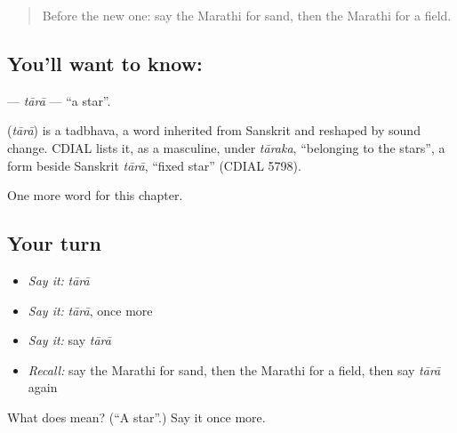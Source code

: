 \begin{quote}
Before the new one: say the Marathi for sand, then the Marathi for a field.
\end{quote}

\subsection*{You'll want to know: }
\textbf{} — \emph{tārā} — \textquotedblleft{}a star\textquotedblright{}.

\begin{cousinweb}
\textbf{} (\emph{tārā}) is a tadbhava, a word inherited from Sanskrit and reshaped by sound change. CDIAL lists it, as a masculine, under \emph{tāraka}, \textquotedblleft{}belonging to the stars\textquotedblright{}, a form beside Sanskrit \emph{tārā}, \textquotedblleft{}fixed star\textquotedblright{} (CDIAL 5798).
\end{cousinweb}

\begin{grammarlens}[title={What you've built}]
One more word for this chapter.
\end{grammarlens}

\subsection*{Your turn}
\begin{itemize}
\raggedright
  \item \emph{Say it:} \emph{tārā}
  \item \emph{Say it:} \emph{tārā}, once more
  \item \emph{Say it:} say \emph{tārā}
  \item \emph{Recall:} say the Marathi for sand, then the Marathi for a field, then say \emph{tārā} again
\end{itemize}

\begin{tcolorbox}[breakable,colback=teal!4,colframe=teal!35!black,title={Before you move on}]
What does  mean? (\textquotedblleft{}A star\textquotedblright{}.) Say it once more.
\end{tcolorbox}
